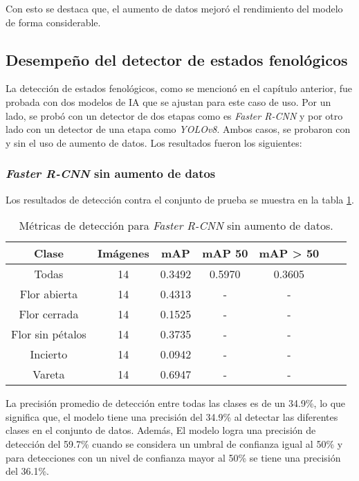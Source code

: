 Con esto se destaca que, el aumento de datos mejoró el rendimiento del modelo de forma considerable.

\subsection{Desempeño del detector de estados fenológicos}

La detección de estados fenológicos, como se mencionó en el capítulo anterior, fue probada con dos modelos de IA que se ajustan para este caso de uso. Por un lado, se probó con un detector de dos etapas como es \textit{Faster R-CNN} y por otro lado con un detector de una etapa como \textit{YOLOv8}. Ambos casos, se probaron con y sin el uso de aumento de datos. Los resultados fueron los siguientes:

\subsubsection{\textit{Faster R-CNN} sin aumento de datos}

Los resultados de detección contra el conjunto de prueba se muestra en la tabla \ref{tab:resultadosFasterSinAug}.

\begin{table}[h]
	\centering
	\caption{Métricas de detección para \textit{Faster R-CNN} sin aumento de datos.}
	\begin{tabular}{c c c c c c c}    
		\toprule
		\textbf{Clase}&\textbf{Imágenes}&\textbf{mAP}&\textbf{mAP 50}&\textbf{mAP > 50}\\
		\midrule
		Todas & 14 & 0.3492 & 0.5970 & 0.3605\\
		Flor abierta & 14 & 0.4313 & - & - \\
		Flor cerrada & 14 & 0.1525 & - & - \\
		Flor sin pétalos & 14 & 0.3735 & - & - \\
		Incierto & 14 & 0.0942 & - & - \\
		Vareta & 14 & 0.6947 & - & - \\		
		\bottomrule
		\hline
	\end{tabular}
	\label{tab:resultadosFasterSinAug}
\end{table}

La precisión promedio de detección entre todas las clases es de un 34.9\%, lo que significa que, el modelo tiene una precisión del 34.9\% al detectar las diferentes clases en el conjunto de datos. Además, El modelo logra una precisión de detección del 59.7\% cuando se considera un umbral de confianza igual al 50\% y para detecciones con un nivel de confianza mayor al 50\% se tiene una precisión del 36.1\%.

